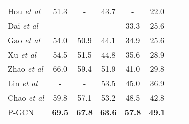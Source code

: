 \documentclass[10pt,twocolumn,letterpaper]{article}
\def\etal{\emph{et al}\onedot}
\begin{document}
\begin{table}[!tb]
\begin{tabular}{lccccccc}
			Hou \etal \cite{hou2017real}             & 51.3          & -             & 43.7          & -            & 22.0                      \\
			Dai \etal \cite{dai2017temporal}         & -             & -            & -             & 33.3          & 25.6                  \\
			Gao \etal \cite{gao2017turn}             & 54.0          & 50.9          & 44.1          & 34.9          & 25.6                   \\
			Xu \etal \cite{xu2017r}                  & 54.5          & 51.5          & 44.8          & 35.6          & 28.9                     \\
			Zhao \etal \cite{zhao2017temporal}       & 66.0          & 59.4          & 51.9          & 41.0          & 29.8                   \\ 
			Lin \etal \cite{lin2018bsn}              & -             & -             & 53.5          & 45.0          & 36.9                  \\
			Chao \etal \cite{chao2018rethinking}     & 59.8          & 57.1          & 53.2          & 48.5          & 42.8          \\ \hline
P-GCN                          & \textbf{69.5} & \textbf{67.8} & \textbf{63.6} & \textbf{57.8} & \textbf{49.1}  \\ \hline
		\end{tabular}
\label{Tab:thumos}
	\end{table}
	
\end{document}
